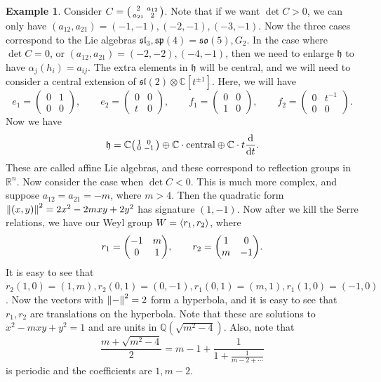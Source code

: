\documentclass[leqno, openany]{memoir}
\theoremstyle{definition}
\newtheorem{exm}[thm]{Example}
\theoremstyle{remark}
\theoremstyle{plain}
\theoremstyle{definition}
\theoremstyle{remark}
\newcommand{\R}{\mathbb{R}}
\newcommand{\C}{\mathbb{C}}
\newcommand{\Q}{\mathbb{Q}}
\newcommand{\mf}[1]{\mathfrak{#1}}
\begin{document}
\begin{exm}
    Consider $C = \begin{psmallmatrix}
        2 & a_{12} \\ a_{21} & 2
    \end{psmallmatrix}$. Note that if we want $\det C > 0$, we can only have $(a_{12}, a_{21}) = (-1,-1), (-2,-1), (-3,-1)$. Now the three cases correspond to the Lie algebras $\mf{sl}_3, \mf{sp}(4) = \mf{so}(5), G_2$. In the case where $\det C = 0$, or $(a_{12}, a_{21}) = (-2,-2), (-4,-1)$, then we need to enlarge $\mf{h}$ to have $\alpha_j(h_i) = a_{ij}$. The extra elements in $\mf{h}$ will be central, and we will need to consider a central extension of $\mf{sl}(2) \otimes \C[t^{\pm 1}]$. Here, we will have
    \[ e_1 = \begin{pmatrix}
        0 & 1 \\ 0 & 0
    \end{pmatrix}, \qquad e_2 = \begin{pmatrix}
        0 & 0 \\ t & 0
    \end{pmatrix}, \qquad f_1 = \begin{pmatrix}
        0 & 0 \\ 1 & 0
    \end{pmatrix}, \qquad f_2 = \begin{pmatrix}
        0 & t^{-1} \\ 0 & 0
    \end{pmatrix}. \]
    Now we have
    \[ \mf{h} = \C \begin{psmallmatrix}
        1 & 0 \\ 0 & -1
    \end{psmallmatrix} \oplus \C \cdot \text{central} \oplus \C \cdot t \dv{t}. \]
    These are called affine Lie algebras, and these correspond to reflection groups in $\R^n$. Now consider the case when $\det C < 0$. This is much more complex, and suppose $a_{12} = a_{21} = -m$, where $m>4$. Then the quadratic form $\norm{(x,y)}^2 = 2x^2 - 2mxy + 2y^2$ has signature $(1,-1)$. Now after we kill the Serre relations, we have our Weyl group $W = \ev{r_1, r_2}$, where 
    \[ r_1 = \mqty(-1 & m \\ 0 & 1), \qquad r_2 = \mqty(1 & 0 \\ m & -1). \]
    It is easy to see that $r_2 (1,0) = (1,m), r_2 (0,1) = (0,-1), r_1(0,1) = (m,1), r_1(1,0) = (-1,0)$. Now the vectors with $\norm{-}^2 = 2$ form a hyperbola, and it is easy to see that $r_1, r_2$ are translations on the hyperbola. Note that these are solutions to $x^2 - mxy + y^2 = 1$ and are units in $\Q(\sqrt{m^2-4})$. Also, note that
    \[ \frac{m+\sqrt{m^2-4}}{2} = m - 1 + \frac{1}{1 + \frac{1}{m-2 + \cdots}} \]
    is periodic and the coefficients are $1, m-2$. 


\end{exm}
\end{document}
